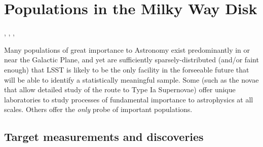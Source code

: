 %
%
%

\section{Populations in the Milky Way Disk}
\def\secname{MW_Disk}\label{sec:\secname}

, , , 

Many populations of great importance to Astronomy exist predominantly
in or near the Galactic Plane, and yet are sufficiently
sparsely-distributed (and/or faint enough) that LSST is likely to be
the only facility in the forseeable future that will be able to
identify a statistically meaningful sample. Some (such as the novae
that allow detailed study of the route to Type Ia Supernovae) offer
unique laboratories to study processes of fundamental importance to
astrophysics at all scales. Others  offer the {\it only}
probe of important populations.



\subsection{Target measurements and discoveries}
\label{sec:\secname:MW_Disk_targets}



